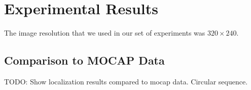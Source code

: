 \section{Experimental Results}\label{sec:results}
The image resolution that we used in our set of experiments was $320 \times 240$.

\subsection{Comparison to MOCAP Data}\label{sec:mocap}
TODO: Show localization results compared to mocap data. Circular sequence.
